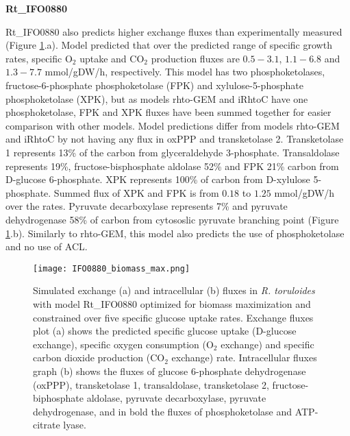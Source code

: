 \textbf{Rt\_IFO0880}

Rt\_IFO0880 also predicts higher exchange fluxes than experimentally measured (Figure \ref{fig:IFO0880_biomass_max}.a). Model predicted that over the predicted range of specific growth rates, specific O$_2$ uptake and CO$_2$ production fluxes are $0.5-3.1$, $1.1-6.8$ and $1.3-7.7$ \unit{mmol/gDW/h}, respectively.
This model has two phosphoketolases, fructose-6-phosphate phosphoketolase (FPK) and xylulose-5-phosphate phosphoketolase (XPK), 
but as models rhto-GEM and iRhtoC
have one phosphoketolase, FPK and XPK fluxes have been summed together for easier comparison with other models.
Model predictions differ from models rhto-GEM and iRhtoC by not having any flux in oxPPP and transketolase 2.
Transketolase 1 represents 13\% of the carbon from glyceraldehyde 3-phosphate. Transaldolase represents 19\%, fructose-bisphosphate 
aldolase 52\% and FPK 21\% carbon from D-glucose 6-phosphate. 
XPK represents 100\% of carbon from D-xylulose 5-phosphate. Summed flux of XPK and FPK is from $0.18$ to $1.25$ \unit{mmol/gDW/h} over the rates.
Pyruvate decarboxylase represents 7\% and pyruvate 
dehydrogenase 58\% of carbon from cytososlic pyruvate branching point (Figure \ref{fig:IFO0880_biomass_max}.b).
Similarly to rhto-GEM, this model also predicts the use of phosphoketolase and no use of ACL. 
\begin{figure}[H]
    \centering
    \texttt{[image: IFO0880\_biomass\_max.png]}
    \caption{Simulated exchange (a) and intracellular (b) fluxes in \textit{R. toruloides} with model Rt\_IFO0880 optimized for biomass maximization and constrained over five specific glucose uptake rates. Exchange fluxes plot (a) shows the predicted specific glucose uptake (D-glucose exchange), specific oxygen consumption (O$_2$ exchange) and specific carbon dioxide production (CO$_2$ exchange) rate. Intracellular fluxes graph (b) shows the fluxes of glucose 6-phosphate dehydrogenase (oxPPP), transketolase 1, transaldolase, transketolase 2, fructose-biphosphate aldolase, pyruvate decarboxylase, pyruvate dehydrogenase, and in bold the fluxes of phosphoketolase and ATP-citrate lyase.}
    \label{fig:IFO0880_biomass_max}
\end{figure}

